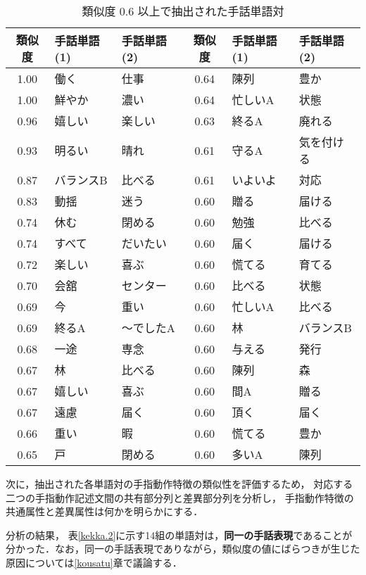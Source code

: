 \begin{table}[htbp]
\caption{類似度 0.6 以上で抽出された手話単語対}
\label{kekka.1}
\begin{center}
\tabcolsep=3pt\footnotesize
\begin{tabular}{c|l|l||c|l|l}\hline
類似度&手話単語(1)&手話単語(2)&類似度&手話単語(1)&手話単語(2)\\
\hline\hline
1.00 & 働く      & 仕事     & 0.64 & 陳列     & 豊か\\
1.00 & 鮮やか    & 濃い     & 0.64 & 忙しいA  & 状態 \\
0.96 & 嬉しい    & 楽しい   & 0.63 & 終るA    & 廃れる\\
0.93 & 明るい    & 晴れ     & 0.61 & 守るA    & 気を付ける\\
0.87 & バランスB & 比べる   & 0.61 & いよいよ & 対応 \\
0.83 & 動揺      & 迷う     & 0.60 & 贈る     & 届ける\\
0.74 & 休む      & 閉める   & 0.60 & 勉強     & 比べる \\
0.74 & すべて    & だいたい & 0.60 & 届く     & 届ける \\
0.72 & 楽しい    & 喜ぶ     & 0.60 & 慌てる   & 育てる\\
0.70 & 会舘      & センター & 0.60 & 比べる   & 状態\\
0.69 & 今        & 重い     & 0.60 & 忙しいA   & 比べる\\
0.69 & 終るA     & 〜でしたA & 0.60 & 林       & バランスB\\
0.68 & 一途      & 専念     & 0.60 & 与える   & 発行\\
0.67 & 林        & 比べる   & 0.60 & 陳列     & 森\\
0.67 & 嬉しい    & 喜ぶ     & 0.60 & 間A      & 贈る\\
0.67 & 遠慮      & 届く     & 0.60 & 頂く     & 届く\\
0.66 & 重い      & 暇       & 0.60 & 慌てる   & 豊か\\
0.65 & 戸        & 閉める   & 0.60 & 多いA   & 陳列\\ \hline
\end{tabular}
\end{center}
\end{table}

次に，抽出された各単語対の手指動作特徴の類似性を評価するため，
対応する二つの手指動作記述文間の共有部分列と差異部分列を分析し，
手指動作特徴の共通属性と差異属性は何かを明らかにする．

分析の結果，
表\ref{kekka.2}に示す14組の単語対は，{\bf 同一の手話表現}であることが
分かった．なお，同一の手話表現でありながら，類似度の値にばらつきが生じた
原因については\ref{kousatu}章で議論する．


